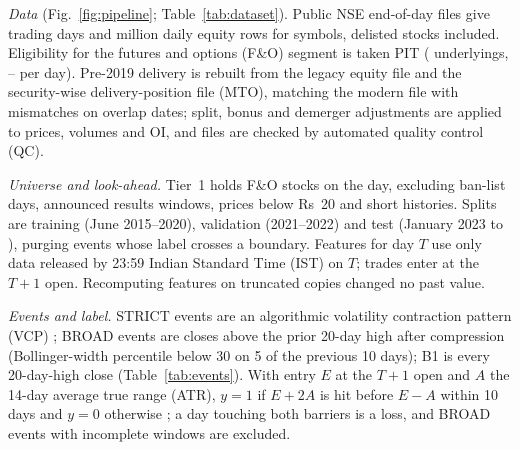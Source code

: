 \documentclass[conference]{IEEEtran}
\begin{document}
\emph{Data} (Fig.~\ref{fig:pipeline}; Table~\ref{tab:dataset}). Public NSE end-of-day files give
\NTradingDays{} trading days and \NEquityRowsM{} million daily equity rows for \NSymbols{} symbols, delisted
stocks included. Eligibility for the futures and options (F\&O) segment is taken PIT (\NFOUnderlyings{}
underlyings, \FOPerDayMin--\FOPerDayMax{} per day). Pre-2019 delivery is rebuilt from the legacy equity file
and the security-wise delivery-position file (MTO), matching the modern file with \NDelivOverlapMismatch{}
mismatches on \NDelivOverlapDates{} overlap dates; \NAdjust{} split, bonus and demerger adjustments are applied
to prices, volumes and OI, and files are checked by automated quality control (QC).

\emph{Universe and look-ahead.} Tier~1 holds F\&O stocks on the day, excluding ban-list days, announced
results windows, prices below Rs~20 and short histories. Splits are training (June 2015--2020), validation
(2021--2022) and test (January 2023 to \DataEnd), purging events whose label crosses a boundary. Features for
day $T$ use only data released by 23:59 Indian Standard Time (IST) on $T$; trades enter at the $T+1$ open.
Recomputing features on \NGOneChecks{} truncated copies changed no past value.

\emph{Events and label.} STRICT events are an algorithmic volatility contraction pattern (VCP)
\cite{minervini2013}; BROAD events are closes above the prior 20-day high after compression (Bollinger-width
percentile below 30 on 5 of the previous 10 days); B1 is every 20-day-high close (Table~\ref{tab:events}).
With entry $E$ at the $T+1$ open and $A$ the 14-day average true range (ATR), $y=1$ if $E+2A$ is hit before
$E-A$ within 10 days and $y=0$ otherwise \cite{lopezdeprado2018}; a day touching both barriers is a loss, and
\IncompleteBroad{} BROAD events with incomplete windows are excluded.



\end{document}
